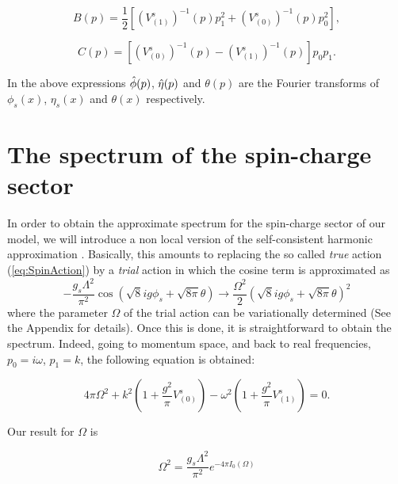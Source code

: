 \documentclass[a4paper,a4paper]{article}
\begin{document}
\begin{equation}\label{eq:B}
B(p)=\frac{1}{2}\left[\left(V^s_{(1)}\right)^{-1}(p)p_1^2
+\left(V^s_{(0)}\right)^{-1}(p)p_0^2\right],
\end{equation}

\begin{equation}\label{eq:C}
C(p)=\left[\left(V^s_{(0)}\right)^{-1}(p)-\left(V^s_{(1)}\right)^{-1}(p)\right]p_0p_1.
\end{equation}

In the above expressions $\hat{\phi}(p)$, $\hat{\eta}(p)$ and $\theta(p)$ are the Fourier
transforms of $\phi_s(x)$, $\eta_s(x)$ and $\theta(x)$ respectively.

\section{The spectrum of the spin-charge sector}

In order to obtain the approximate spectrum for the spin-charge sector of our model,
we will introduce a non local version of the self-consistent harmonic approximation
\cite{SCHA}. Basically, this amounts to replacing the so called {\em true} action
(\ref{eq:SpinAction}) by a {\em trial} action in which the cosine term is approximated
as
\begin{equation}
-\frac{g_s\Lambda^2}{\pi^2}
\cos\left(\sqrt{8}ig\phi_s+\sqrt{8\pi}\theta\right)\rightarrow \frac{\Omega^2}{2}
\left(\sqrt{8}ig\phi_s+\sqrt{8\pi}\theta\right)^2
\end{equation}
where the parameter $\Omega$ of the trial action can be variationally determined (See
the Appendix for details). Once this is done, it is straightforward to obtain the
spectrum. Indeed, going to momentum space, and back to real frequencies,
$p_0=i\omega$, $p_1=k$, the following equation is obtained:

\begin{equation}\label{eq:spectrum}
4\pi\Omega^2 + k^2(1+\frac{g^2}{\pi}V^s_{(0)})
-\omega^2(1+\frac{g^2}{\pi}V^s_{(1)})=0.
\end{equation}

Our result for $\Omega$ is

\begin{equation}\label{gap}
\Omega^2=\frac{g_s\Lambda^2}{\pi^2} e^{-4\pi I_0(\Omega)}
\end{equation}
\end{document}
